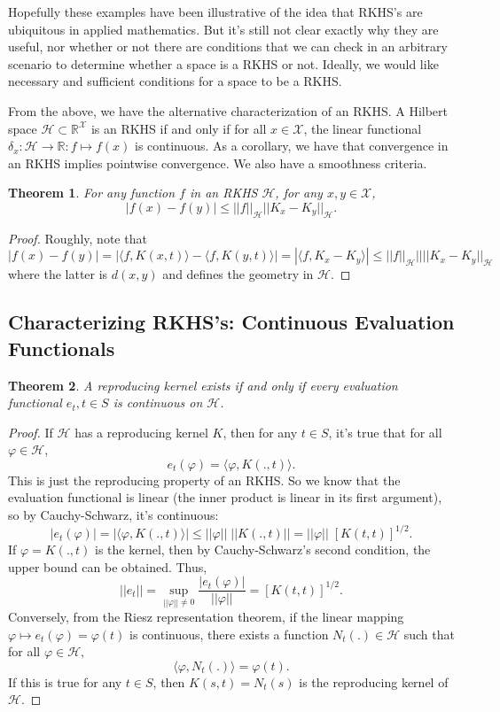 \documentclass[psamsfonts]{amsart}
\newtheorem{thm}{Theorem}[section]
\theoremstyle{definition}
\theoremstyle{remark}
\numberwithin{equation}{section}
\begin{document}
Hopefully these examples have been illustrative of the idea that RKHS's are ubiquitous in applied mathematics. But it's still not clear exactly why they are useful, nor whether or not there are conditions that we can check in an arbitrary scenario to determine whether a space is a RKHS or not. Ideally, we would like necessary and sufficient conditions for a space to be a RKHS. 

From the above, we have the alternative characterization of an RKHS. A Hilbert space $\mathcal{H} \subset \mathbb{R}^{\mathcal{X}}$ is an RKHS if and only if for all $x \in \mathcal{X}$, the linear functional $\delta _x : \mathcal{H} \rightarrow \mathbb{R} : f \mapsto f(x)$ is continuous. As a corollary, we have that convergence in an RKHS implies pointwise convergence. We also have a smoothness criteria.

\begin{thm}
For any function $f$ in an RKHS $\mathcal{H}$, for any $x,y \in \mathcal{X}$, 
$$|f(x) - f(y)| \leq || f|| _{\mathcal{H}} || K_x - K_y||_{\mathcal{H}}. $$
\end{thm}

\begin{proof}
Roughly, note that 
$$|f(x) - f(y)| = |\langle f, K(x,t) \rangle - \langle f, K(y,t) \rangle | = | \langle f, K_x - K_y \rangle | \leq || f|| _{\mathcal{H}} || ||K_x - K_y|| _{\mathcal{H}}$$
where the latter is $d(x,y)$ and defines the geometry in $\mathcal{H}.$
\end{proof}

\subsection{Characterizing RKHS's: Continuous Evaluation Functionals}
\begin{thm} 
A reproducing kernel exists if and only if every evaluation functional $e_t, t \in S$ is continuous on $\mathcal{H}$.
\end{thm} 
\begin{proof}
If $\mathcal{H}$ has a reproducing kernel $K$, then for any $t \in S$, it's true that for all $\varphi \in \mathcal{H}$, 
$$e_t (\varphi ) = \langle \varphi , K(., t) \rangle . $$  This is just the reproducing property of an RKHS. So we know that the evaluation functional is linear (the inner product is linear in its first argument), so by Cauchy-Schwarz, it's continuous: 
$$|e_t (\varphi )| = | \langle \varphi , K(. , t) \rangle | \leq || \varphi || \; || K(., t)|| = || \varphi || \; [K(t,t)]^{1/2}.$$ 
If $\varphi = K(. , t)$ is the kernel, then by Cauchy-Schwarz's second condition, the upper bound can be obtained. Thus, 
$$|| e_t || = \sup _{||\varphi || \neq 0} \frac{|e_t (\varphi )|}{|| \varphi ||} = [K(t, t)]^{1/2}.$$
Conversely, from the Riesz representation theorem, if the linear mapping $\varphi \mapsto e_t (\varphi ) = \varphi (t)$ is continuous, there exists a function $N_t (.) \in \mathcal{H}$ such that for all $\varphi \in \mathcal{H},$
$$\langle \varphi, N_t (.) \rangle = \varphi (t).$$
If this is true for any $t \in S$, then $K(s, t) = N_t (s)$ is the reproducing kernel of $\mathcal{H}.$
\end{proof}
\end{document}
